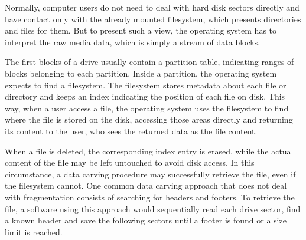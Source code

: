 Normally, computer users do not need to deal with hard disk sectors directly and have contact only with the already mounted filesystem, which presents directories and files for them. But to present such a view, the operating system has to interpret the raw media data, which is simply a stream of data blocks.

The first blocks of a drive usually contain a partition table, indicating ranges of blocks belonging to each partition. Inside a partition, the operating system expects to find a filesystem. The filesystem stores metadata about each file or directory and keeps an index indicating the position of each file on disk. This way, when a user access a file, the operating system uses the filesystem to find where the file is stored on the disk, accessing those areas directly and returning its content to the user, who sees the returned data as the file content. 

When a file is deleted, the corresponding index entry is erased, while the actual content of the file may be left untouched to avoid disk access. In this circumstance, a data carving procedure may successfully retrieve the file, even if the filesystem cannot. One common data carving approach that does not deal with fragmentation consists of searching for headers and footers. To retrieve the file, a software using this approach would sequentially read each drive sector, find a known header and save the following sectors until a footer is found or a size limit is reached. 
